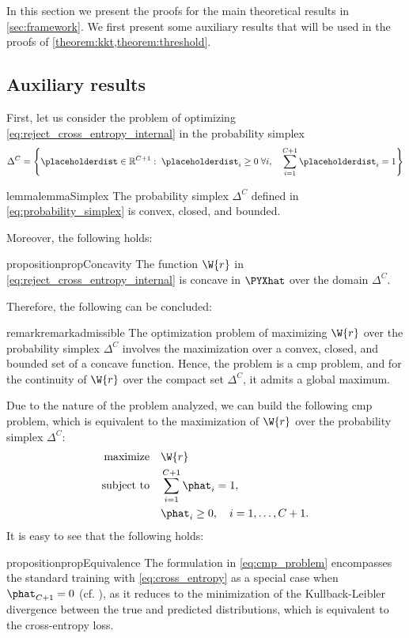 In this section we present the proofs for the main theoretical results in \cref{sec:framework}. We first present some auxiliary results that will be used in the proofs of \cref{theorem:kkt,theorem:threshold}.

\subsection{Auxiliary results}
\label{subsec:auxiliary_results}
First, let us consider the problem of optimizing \cref{eq:reject_cross_entropy_internal} in the probability simplex
\begin{align}
    \label{eq:probability_simplex}
    \Delta^{C} = \left\{ \placeholderdist \in \mathbb{R}^{C+1}:\; \placeholderdist_i \ge 0 \; \forall i, \quad \sum_{i=1}^{C+1} \placeholderdist_i = 1 \right\}
\end{align}

\begin{restatable}{lemma}{lemmaSimplex}
    \label{lemma:simplex_properties}
    The probability simplex \(\Delta^{C}\) defined in \cref{eq:probability_simplex} is convex, closed, and bounded.
\end{restatable}
Moreover, the following holds:
\begin{restatable}{proposition}{propConcavity}
    \label{prop:concavity}
    The function \(\W{r}\) in \cref{eq:reject_cross_entropy_internal} is concave in \(\PYXhat\) over the domain \(\Delta^{C}\).
\end{restatable}
Therefore, the following can be concluded:
\begin{restatable}{remark}{remarkadmissible}
    \label{remark:admissible}
    The optimization problem of maximizing \(\W{r}\) over the probability simplex \(\Delta^{C}\) involves the maximization over a convex, closed, and bounded set of a concave function. Hence, the problem is a \gls*{cmp} problem, and for the continuity of \(\W{r}\) over the compact set \(\Delta^{C}\), it admits a global maximum.
\end{restatable}
Due to the nature of the problem analyzed, we can build the following \gls*{cmp} problem, which is equivalent to the maximization of \(\W{r}\) over the probability simplex \(\Delta^{C}\):
\begin{align}
    \label{eq:cmp_problem}
    \begin{aligned}
        \text{maximize}\quad   & \W{r}                               \\
        \text{subject to}\quad & \sum_{i=1}^{C+1} \phat_i = 1,       \\
                               & \phat_i \ge 0, \quad i=1,\dots,C+1.
    \end{aligned}
\end{align}
It is easy to see that the following holds:
\begin{restatable}{proposition}{propEquivalence}
    \label{prop:equivalence}
    The formulation in \cref{eq:cmp_problem} encompasses the standard training with \cref{eq:cross_entropy} as a special case when \(\phat_{C+1}=0\) (cf. \cite{liu2019deep}), as it reduces to the minimization of the Kullback-Leibler divergence between the true and predicted distributions, which is equivalent to the cross-entropy loss.
\end{restatable}
